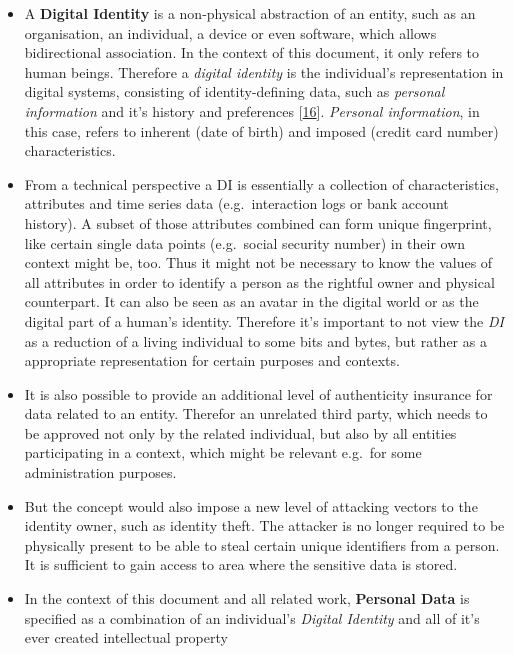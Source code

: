 \documentclass[12pt,english,a4paper,titlepage,cleardoublepage=empty,dottedtoc]{report}
\begin{document}
\begin{itemize}
\item
  A \textbf{Digital Identity} is a non-physical abstraction of an
  entity, such as an organisation, an individual, a device or even
  software, which allows bidirectional association. In the context of
  this document, it only refers to human beings. Therefore a
  \emph{digital identity} is the individual's representation in digital
  systems, consisting of identity-defining data, such as \emph{personal
  information} and it's history and preferences
  {[}\protect\hyperlink{ref-whitepaper_2012_the-value-of-our-digital-identity_definition}{16}{]}.
  \emph{Personal information}, in this case, refers to inherent (date of
  birth) and imposed (credit card number) characteristics.
\item
  From a technical perspective a DI is essentially a collection of
  characteristics, attributes and time series data (e.g.~interaction
  logs or bank account history). A subset of those attributes combined
  can form unique fingerprint, like certain single data points
  (e.g.~social security number) in their own context might be, too. Thus
  it might not be necessary to know the values of all attributes in
  order to identify a person as the rightful owner and physical
  counterpart. It can also be seen as an avatar in the digital world or
  as the digital part of a human's identity. Therefore it's important to
  not view the \emph{DI} as a reduction of a living individual to some
  bits and bytes, but rather as a appropriate representation for certain
  purposes and contexts.
\item
  It is also possible to provide an additional level of authenticity
  insurance for data related to an entity. Therefor an unrelated third
  party, which needs to be approved not only by the related individual,
  but also by all entities participating in a context, which might be
  relevant e.g.~for some administration purposes.
\item
  But the concept would also impose a new level of attacking vectors to
  the identity owner, such as identity theft. The attacker is no longer
  required to be physically present to be able to steal certain unique
  identifiers from a person. It is sufficient to gain access to area
  where the sensitive data is stored.
\item
  In the context of this document and all related work, \textbf{Personal
  Data} is specified as a combination of an individual's \emph{Digital
  Identity} and all of it's ever created intellectual property

\end{itemize}
\end{document}
